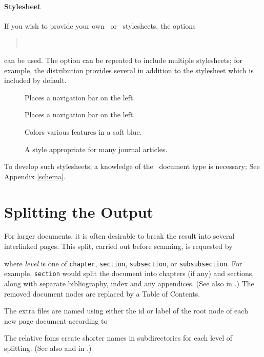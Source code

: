 \documentclass{book}
\begin{document}
\paragraph{Stylesheet}
If you wish to provide your own \XSLT\  or
\CSS\ stylesheets, the options 
\begin{quote}
\\
\end{quote}
 can be used.  The  option can be repeated to include multiple stylesheets;
for example, the distribution provides several in addition to the  stylesheet
which is included by default.
\begin{description}
\item[] Places a navigation bar on the left.
\item[] Places a navigation bar on the left.
\item[] Colors various features in a soft blue.
\item[] A style appropriate for many journal articles.
\end{description}

To develop such stylesheets, a knowledge
of the \LaTeXML\ document type is necessary; See Appendix \ref{schema}.

\section[Splitting]{Splitting the Output}\label{usage.multiple}
For larger documents, it is often desirable to break the 
result into several interlinked pages. This split,
carried out before scanning, is requested by 
\begin{quote}
\end{quote}
where \textit{level} is one of \texttt{chapter},
\texttt{section}, \texttt{subsection}, or \texttt{subsubsection}.
For example, \texttt{section} would split the document into
chapters (if any) and sections, along with separate
bibliography, index and any appendices.
(See also  in .)
The removed document nodes are replaced by a Table of Contents.

The extra files are named using either the id or label
of the root node of each new page document according to
\begin{quote}
\end{quote}
The relative foms create shorter names in subdirectories for each
level of splitting.
(See also  and   in .)
\end{document}
